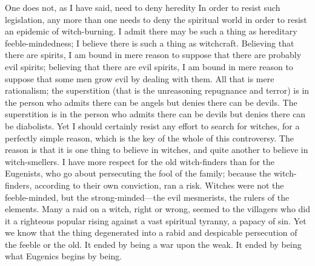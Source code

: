 \documentclass{book}
\begin{document}
One does not, as I have said, need to deny heredity In order to resist such legislation, any more than one needs to deny the spiritual world in order to resist an epidemic of witch-burning. I admit there may be such a thing as hereditary feeble-mindedness; I believe there is such a thing as witchcraft. Believing that there are spirits, I am bound in mere reason to suppose that there are probably evil spirits; believing that there are evil spirits, I am bound in mere reason to suppose that some men grow evil by dealing with them. All that is mere rationalism; the superstition (that is the unreasoning repugnance and terror) is in the person who admits there can be angels but denies there can be devils. The superstition is in the person who admits there can be devils but denies there can be diabolists. Yet I should certainly resist any effort to search for witches, for a perfectly simple reason, which is the key of the whole of this controversy. The reason is that it is one thing to believe in witches, and quite another to believe in witch-smellers. I have more respect for the old witch-finders than for the Eugenists, who go about persecuting the fool of the family; because the witch-finders, according to their own conviction, ran a risk. Witches were not the feeble-minded, but the strong-minded—the evil mesmerists, the rulers of the elements. Many a raid on a witch, right or wrong, seemed to the villagers who did it a righteous popular rising against a vast spiritual tyranny, a papacy of sin. Yet we know that the thing degenerated into a rabid and despicable persecution of the feeble or the old. It ended by being a war upon the weak. It ended by being what Eugenics begins by being.
\end{document}
